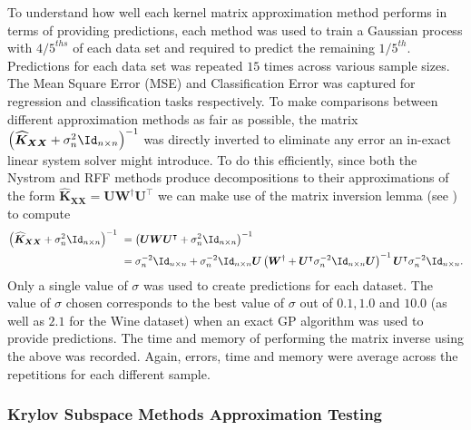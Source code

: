To understand how well each kernel matrix approximation method performs in terms of providing predictions, each method was used to train a Gaussian process with ${4/5}^{ths}$ of each data set and required to predict the remaining ${1/5}^{th}$. Predictions for each data set was repeated $15$ times across various sample sizes. The Mean Square Error (MSE) and Classification Error was captured for regression and classification tasks respectively. To make comparisons between different approximation methods as fair as possible, the matrix $\left( \widehat{\bm{K}}_{\bm{XX}} + \sigma_n^2 \Id_{n \times n} \right)^{-1}$ was directly inverted to eliminate any error an in-exact linear system solver might introduce. To do this efficiently, since both the Nystrom and RFF methods produce decompositions to their approximations of the form $\widehat{\bm{K}}_{\bm{XX}} = \bm{U} \bm{W}^{\dagger} \bm{U}^{\intercal}$ we can make use of the matrix inversion lemma (see ) to compute
\begin{align*}
    \left( \widehat{\bm{K}}_{\bm{XX}} + \sigma_n^2 \Id_{n \times n} \right)^{-1} \
     & = \left( \bm{U} \bm{W} \bm{U}^{\intercal} + \sigma_n^2 \Id_{n \times n} \right)^{-1}                                                                                                                                        \\
     & = \sigma_n^{-2} \Id_{n \times n} + \sigma_n^{-2} \Id_{n \times n} \bm{U} \left( \bm{W}^{\dagger} + \bm{U}^{\intercal} \sigma_n^{-2} \Id_{n \times n} \bm{U} \right)^{-1} \bm{U}^{\intercal} \sigma_n^{-2} \Id_{n \times n}.
\end{align*}
Only a single value of $\sigma$ was used to create predictions for each dataset. The value of $\sigma$ chosen corresponds to the best value of $\sigma$ out of $0.1,1.0$ and $10.0$ (as well as $2.1$ for the Wine dataset) when an exact GP algorithm was used to provide predictions. The time and memory of performing the matrix inverse using the above was recorded. Again, errors, time and memory were average across the repetitions for each different sample.

\subsubsection{Krylov Subspace Methods Approximation Testing}\label{Section5.2.2}

